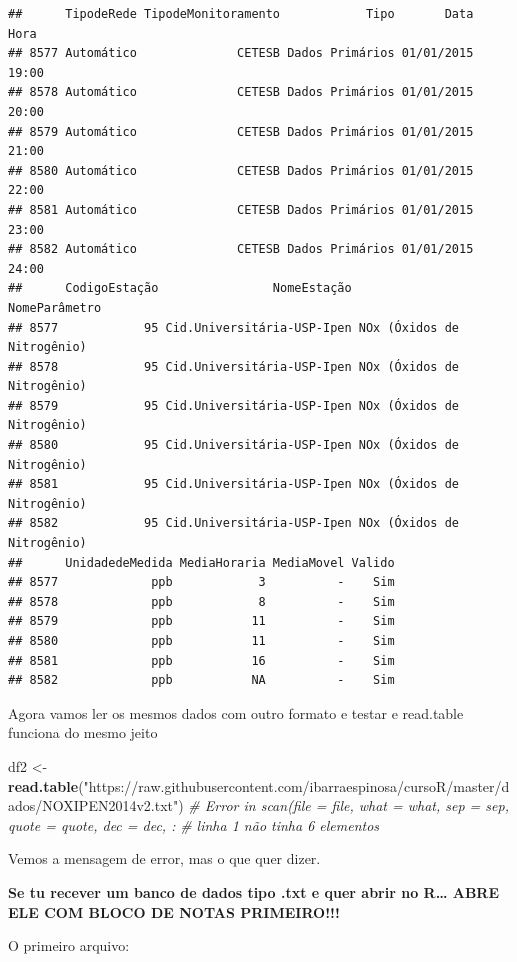 \documentclass[]{book}
\newenvironment{Shaded}{\begin{snugshade}}{\end{snugshade}}
\newcommand{\KeywordTok}[1]{\textcolor[rgb]{0.13,0.29,0.53}{\textbf{#1}}}
\newcommand{\StringTok}[1]{\textcolor[rgb]{0.31,0.60,0.02}{#1}}
\newcommand{\CommentTok}[1]{\textcolor[rgb]{0.56,0.35,0.01}{\textit{#1}}}
\newcommand{\NormalTok}[1]{#1}
\begin{document}
\begin{verbatim}
##      TipodeRede TipodeMonitoramento            Tipo       Data  Hora
## 8577 Automático              CETESB Dados Primários 01/01/2015 19:00
## 8578 Automático              CETESB Dados Primários 01/01/2015 20:00
## 8579 Automático              CETESB Dados Primários 01/01/2015 21:00
## 8580 Automático              CETESB Dados Primários 01/01/2015 22:00
## 8581 Automático              CETESB Dados Primários 01/01/2015 23:00
## 8582 Automático              CETESB Dados Primários 01/01/2015 24:00
##      CodigoEstação                NomeEstação              NomeParâmetro
## 8577            95 Cid.Universitária-USP-Ipen NOx (Óxidos de Nitrogênio)
## 8578            95 Cid.Universitária-USP-Ipen NOx (Óxidos de Nitrogênio)
## 8579            95 Cid.Universitária-USP-Ipen NOx (Óxidos de Nitrogênio)
## 8580            95 Cid.Universitária-USP-Ipen NOx (Óxidos de Nitrogênio)
## 8581            95 Cid.Universitária-USP-Ipen NOx (Óxidos de Nitrogênio)
## 8582            95 Cid.Universitária-USP-Ipen NOx (Óxidos de Nitrogênio)
##      UnidadedeMedida MediaHoraria MediaMovel Valido
## 8577             ppb            3          -    Sim
## 8578             ppb            8          -    Sim
## 8579             ppb           11          -    Sim
## 8580             ppb           11          -    Sim
## 8581             ppb           16          -    Sim
## 8582             ppb           NA          -    Sim
\end{verbatim}

Agora vamos ler os mesmos dados com outro formato e testar e read.table
funciona do mesmo jeito

\begin{Shaded}
\begin{Highlighting}[]
\NormalTok{df2 <-}\StringTok{ }\KeywordTok{read.table}\NormalTok{(}\StringTok{"https://raw.githubusercontent.com/ibarraespinosa/cursoR/master/dados/NOXIPEN2014v2.txt"}\NormalTok{)}
\CommentTok{# Error in scan(file = file, what = what, sep = sep, quote = quote, dec = dec, : }
\CommentTok{# linha 1 não tinha 6 elementos}
\end{Highlighting}
\end{Shaded}

Vemos a mensagem de error, mas o que quer dizer.

\textbf{Se tu recever um banco de dados tipo .txt e quer abrir no
R\ldots{} ABRE ELE COM BLOCO DE NOTAS PRIMEIRO!!!}

O primeiro arquivo:
\end{document}
